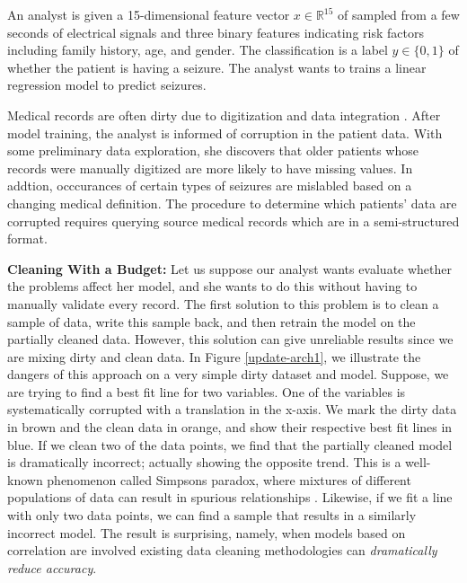 \begin{example}
An analyst is given a 15-dimensional feature vector $x \in \mathbb{R}^{15}$ of sampled from a few seconds of electrical signals and three binary features indicating risk factors including family history, age, and gender.
The classification is a label $y\in \{0,1\}$ of whether the patient is having a seizure.
The analyst wants to trains a linear regression model to predict seizures.

Medical records are often dirty due to digitization and data integration \cite{fortunearticle}.
After model training, the analyst is informed of corruption in the patient data.
With some preliminary data exploration, she discovers that older patients whose records were manually digitized are more likely to have missing values.
In addtion, occcurances of certain types of seizures are mislabled based on a changing medical definition.
The procedure to determine which patients' data are corrupted requires querying source medical records which are in a semi-structured format.
\end{example}

\noindent\textbf{Cleaning With a Budget: }  Let us suppose our analyst wants evaluate whether the problems affect her model, and she wants to do this without having to manually validate every record. The first solution to this problem is to clean a sample of data, write this sample back, and then retrain the model on the partially cleaned data.
However, this solution can give unreliable results since we are mixing dirty and clean data.
In Figure \ref{update-arch1}, we illustrate the dangers of this approach on a very simple dirty dataset and model.
Suppose, we are trying to find a best fit line for two variables. 
One of the variables is systematically corrupted with a translation in the x-axis.
We mark the dirty data in brown and the clean data in orange, and show their respective best fit lines in blue.
If we clean two of the data points, we find that the partially cleaned model is dramatically incorrect; actually showing the opposite trend.
This is a well-known phenomenon called Simpsons paradox, where mixtures of different populations of data can result in spurious relationships \cite{simpson1951interpretation}.
Likewise, if we fit a line with only two data points, we can find a sample that results in a similarly incorrect model.
The result is surprising, namely, when models based on correlation are involved existing data cleaning methodologies can \emph{dramatically reduce accuracy}.

